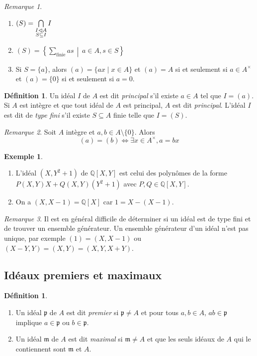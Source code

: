 \documentclass{article}
\newcommand{\Q}{\mathbb{Q}}
\newcommand{\prem}{\mathfrak{p}}
\newcommand{\maxid}{\mathfrak{m}}
\newcommand{\midbar}{\, \middle|\,}
\theoremstyle{plain}
\theoremstyle{definition}
\newtheorem{definition}[theorem]{Définition}
\newtheorem{example}[theorem]{Exemple}
\theoremstyle{remark}
\newtheorem*{remark}{Remarque}
\begin{document}
\begin{remark} \leavevmode
    \begin{enumerate}
        \item $(S) = \bigcap\limits_{\begin{subarray}{c} I \lhd A \\ S \subseteq I \end{subarray}} I$
        \item $(S) = \left\{\sum\limits_{\text{finie}} as \midbar a \in A, s \in S\right\}$
        \item Si $S = \{a\}$, alors $(a) = \{ax \mid x\in A\}$ et $(a) = A$ si et seulement si $a \in A^\times$ et $(a) = \{0\}$ si et seulement si $a = 0$.
    \end{enumerate}
\end{remark}

\begin{definition}
    Un idéal $I$ de $A$ est dit \emph{principal} s'il existe $a \in A$ tel que $I = (a)$. Si $A$ est intègre et que tout idéal de $A$ est principal, $A$ est dit \emph{principal}. L'idéal $I$ est dit de \emph{type fini} s'il existe $S \subseteq A$ finie telle que $I = (S)$.
\end{definition}

\begin{remark}
    Soit $A$ intègre et $a,b \in A \setminus \{0\}$. Alors
    \[(a) = (b) \iff \exists x \in A^\times, a=bx\]
\end{remark}

\begin{example} \leavevmode
    \begin{enumerate}
        \item L'idéal $(X,Y^2 +1)$ de $\Q[X,Y]$ est celui des polynômes de la forme $P(X,Y)X + Q(X,Y)(Y^2+1)$ avec $P,Q \in \Q[X,Y]$.
        \item On a $(X,X-1) = \Q[X]$ car $1 = X - (X-1)$.
    \end{enumerate}
\end{example}

\begin{remark}
    Il est en général difficile de déterminer si un idéal est de type fini et de trouver un ensemble générateur. Un ensemble générateur d'un idéal n'est pas unique, par exemple $(1) = (X,X-1)$ ou $(X-Y,Y) = (X,Y) = (X,Y,X+Y)$.
\end{remark}

\subsection{Idéaux premiers et maximaux}
\begin{definition} \leavevmode
    \begin{enumerate}
        \item Un idéal $\prem$ de $A$ est dit \emph{premier} si $\prem \ne A$ et pour tous $a,b \in A$, $ab \in \prem$ implique $a \in \prem$ ou $b \in \prem$.
        \item Un idéal $\maxid$ de $A$ est dit \emph{maximal} si $\maxid \ne A$ et que les seuls idéaux de $A$ qui le contiennent sont $\maxid$ et $A$.
    \end{enumerate}
\end{definition}
\end{document}
